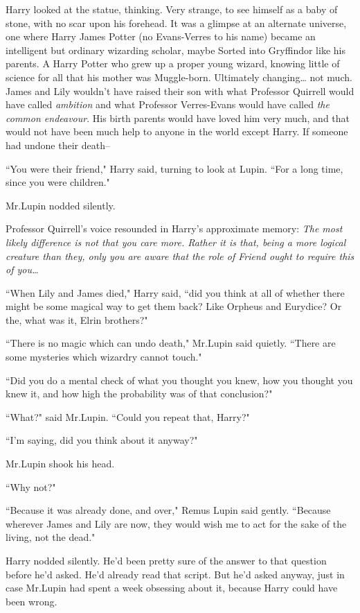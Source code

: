 Harry looked at the statue, thinking. Very strange, to see himself as a baby of stone, with no scar upon his forehead. It was a glimpse at an alternate universe, one where Harry James Potter (no Evans-Verres to his name) became an intelligent but ordinary wizarding scholar, maybe Sorted into Gryffindor like his parents. A Harry Potter who grew up a proper young wizard, knowing little of science for all that his mother was Muggle-born. Ultimately changing{\ldots} not much. James and Lily wouldn't have raised their son with what Professor Quirrell would have called \emph{ambition} and what Professor Verres-Evans would have called \emph{the common endeavour}. His birth parents would have loved him very much, and that would not have been much help to anyone in the world except Harry. If someone had undone their death\---

``You were their friend," Harry said, turning to look at Lupin. ``For a long time, since you were children."

Mr.\?Lupin nodded silently.

Professor Quirrell's voice resounded in Harry's approximate memory: \emph{The most likely difference is not that you care more. Rather it is that, being a more logical creature than they, only you are aware that the role of Friend ought to require this of you{\ldots}}

``When Lily and James died," Harry said, ``did you think at all of whether there might be some magical way to get them back? Like Orpheus and Eurydice? Or the, what was it, Elrin brothers?"

``There is no magic which can undo death," Mr.\?Lupin said quietly. ``There are some mysteries which wizardry cannot touch."

``Did you do a mental check of what you thought you knew, how you thought you knew it, and how high the probability was of that conclusion?"

``What?" said Mr.\?Lupin. ``Could you repeat that, Harry?"

``I'm saying, did you think about it anyway?"

Mr.\?Lupin shook his head.

``Why not?"

``Because it was already done, and over," Remus Lupin said gently. ``Because wherever James and Lily are now, they would wish me to act for the sake of the living, not the dead."

Harry nodded silently. He'd been pretty sure of the answer to that question before he'd asked. He'd already read that script. But he'd asked anyway, just in case Mr.\?Lupin had spent a week obsessing about it, because Harry could have been wrong.

